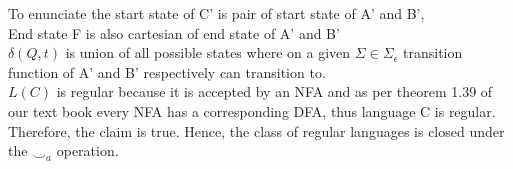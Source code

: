 \documentclass[addpoints]{exam}
\theoremstyle{claim}
\begin{document}
\begin{questions}
\begin{solution}
\begin{itemize}
      To enunciate the start state of C' is pair of start state of A' and B', \\
      End state F is also cartesian of end state of A' and B'\\
      $\delta(Q, t)$ is union of all possible states where on a given $\Sigma \in \Sigma_\epsilon $ transition function of A' and B' respectively can transition to. \\
  
    
    
      $L(C)$ is regular because it is accepted by an NFA and as per theorem 1.39 of our text book every NFA has a corresponding DFA, thus language C is regular. 
      Therefore, the claim is true.
      Hence, the class of regular languages is closed under the $\smile_a$ operation.
    \end{itemize}
    
  \end{solution}
\end{questions}
\end{document}
